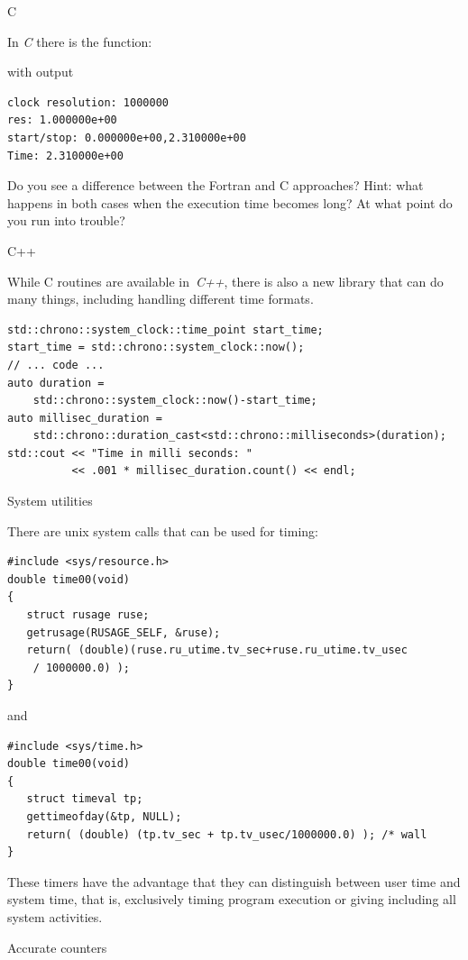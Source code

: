  {C}

In \emph{C} there is the  function:

with output
\begin{verbatim}
clock resolution: 1000000
res: 1.000000e+00
start/stop: 0.000000e+00,2.310000e+00
Time: 2.310000e+00
\end{verbatim}
Do you see a difference between the Fortran and C approaches? Hint:
what happens in both cases when the execution time becomes long? At
what point do you run into trouble?

 {C++}

While C routines are available in~\emph{C++}, there is also a new
 library that can do many things, including
handling different time formats.
\begin{verbatim}
std::chrono::system_clock::time_point start_time;
start_time = std::chrono::system_clock::now();
// ... code ...
auto duration =
    std::chrono::system_clock::now()-start_time;
auto millisec_duration =
    std::chrono::duration_cast<std::chrono::milliseconds>(duration);
std::cout << "Time in milli seconds: " 
          << .001 * millisec_duration.count() << endl;
\end{verbatim}

 {System utilities}

There are unix system calls that can be used for timing:
\begin{verbatim}
#include <sys/resource.h>                        
double time00(void)                              
{                                                
   struct rusage ruse;
   getrusage(RUSAGE_SELF, &ruse);
   return( (double)(ruse.ru_utime.tv_sec+ruse.ru_utime.tv_usec
    / 1000000.0) );
}
\end{verbatim}
and 
\begin{verbatim}
#include <sys/time.h>
double time00(void)
{
   struct timeval tp;
   gettimeofday(&tp, NULL);
   return( (double) (tp.tv_sec + tp.tv_usec/1000000.0) ); /* wall
}
\end{verbatim}
These timers have the advantage that they can
distinguish between user time and system time, that is, exclusively
timing program execution or giving 
including all system activities.


 {Accurate counters}


